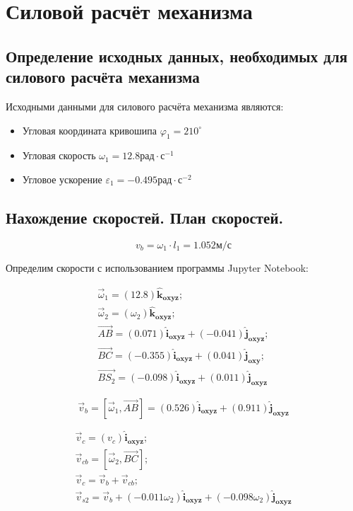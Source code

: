\section{Силовой расчёт механизма}

\subsection{Определение исходных данных, необходимых для силового расчёта механизма}

Исходными данными для силового расчёта механизма являются:

\begin{itemize}
	\item Угловая координата кривошипа $ \varphi_1 = 210^{\circ}$
	\item Угловая скорость $ \omega_1 = 12.8 рад \cdot с^{-1} $
	\item Угловое ускорение $ \varepsilon_1 = -0.495 рад \cdot с^{-2} $
\end{itemize}

\subsection{Нахождение скоростей. План скоростей.}

\begin{equation}
	v_b = \omega_1 \cdot l_1 = 1.052 м/с
\end{equation}

Определим скорости с использованием программы Jupyter Notebook:


\begin{eqnarray}
	\vec \omega_1 = (12.8)\mathbf{\hat{k}_{oxyz}}; \\
	\vec \omega_2 = (\omega_{2})\mathbf{\hat{k}_{oxyz}}; \\
	\vec {AB} = (0.071)\mathbf{\hat{i}_{oxyz}} + (-0.041)\mathbf{\hat{j}_{oxyz}}; \\
	\vec {BC} = (-0.355)\mathbf{\hat{i}_{oxyz}} + (0.041)\mathbf{\hat{j}_{oxy}}; \\
	\vec {BS_2} = (-0.098)\mathbf{\hat{i}_{oxyz}} + (0.011)\mathbf{\hat{j}_{oxyz}}
\end{eqnarray}

\begin{equation}
	\vec v_b = [\vec \omega_1, \vec {AB}] = (0.526)\mathbf{\hat{i}_{oxyz}} + (0.911)\mathbf{\hat{j}_{oxyz}}
\end{equation}

\begin{eqnarray}
	\vec v_c =(v_c)\mathbf{\hat{i}_{oxyz}}; \\
	\vec v_{cb} =[\vec \omega_2, \vec {BC}]; \\
	\vec v_c = \vec v_b + \vec v_{cb}; \\
	\vec v_{s2} = \vec v_b + (- 0.011 \omega_{2})\mathbf{\hat{i}_{oxyz}} + (- 0.098 \omega_{2})\mathbf{\hat{j}_{oxyz}}
\end{eqnarray}

